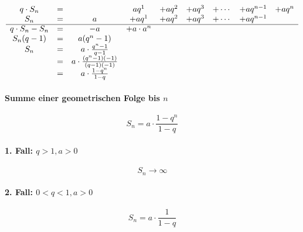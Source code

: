 \[
	\begin{array}{ccccccccc}
		q \cdot S_n       & = &                                           & a q^1         & + a q^2  & + a q^3 & + \cdots & + a q^{n-1} & + a q^n \\
		S_n               & = & a                                         & + a q^1       & + a  q^2 & + a q^3 & + \cdots & + a q^{n-1} &         \\
		\cline{1-9}
		q \cdot S_n - S_n & = & -a                                        & + a \cdot a^n &          &         &          &             &         \\
		S_n(q-1)          & = & a(q^n -1)                                 &               &          &         &          &             &         \\
		S_n               & = & a \cdot \frac{q^n - 1}{q - 1}             &               &          &         &          &             &         \\
		                  & = & a \cdot \frac{(q^n - 1)(-1)}{(q - 1)(-1)} &               &          &         &          &             &         \\
		                  & = & a \cdot \frac{1- q^n}{1 - q}              &               &          &         &          &             &         \\
	\end{array}
\]

\begin{gesetz}
	\paragraph{Summe einer geometrischen Folge bis \(n\)}
	\[
		S_n = a \cdot \frac{1 - q^n}{1 - q}
	\]
\end{gesetz}

\paragraph{1. Fall: \(q > 1, a > 0\)}

\[
	S_n \rightarrow \infty
\]

\paragraph{2. Fall: \(0 < q < 1, a > 0\)}

\[
	S_n = a \cdot \frac{1}{1-q}
\]
